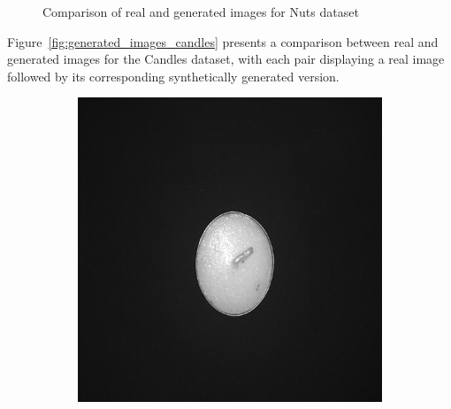\documentclass[12pt,DIV14,BCOR12mm,a4paper,footinclude=false,headinclude,parskip=half-,twoside,openright,cleardoublepage=empty,toc=index,bibliography=totoc,listof=totoc]{scrreprt}
\numberwithin{equation}{chapter}
\begin{document}
\begin{figure}
    \caption{Comparison of real and generated images for Nuts dataset}
    \label{fig:generated_images_nuts}
\end{figure}


Figure~\ref{fig:generated_images_candles} presents a comparison between real and generated images for the Candles dataset, with each pair displaying a real image followed by its corresponding synthetically generated version.

\begin{figure}
    \centering

    \begin{subfigure}[t]{0.45\textwidth}
        \centering
        \includegraphics[width=\textwidth]{../media/diff_candles_optimal_real.png}
    \end{subfigure}%
    \hspace{0.02\textwidth}%
    \begin{subfigure}[t]{0.45\textwidth}
        \centering

\end{subfigure}
\end{figure}
\end{document}
